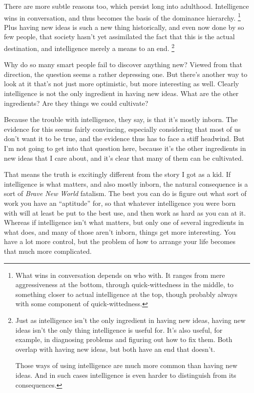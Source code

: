 There are more subtle reasons too, which persist long into adulthood.
Intelligence wins in conversation, and thus becomes the basis of the
dominance hierarchy. \footnote{What wins in conversation depends on who with. It ranges from
mere aggressiveness at the bottom, through quick-wittedness in the
middle, to something closer to actual intelligence at the top, though
probably always with some component of quick-wittedness.} Plus having new ideas is
such a new thing historically, and even now done by so few people, that
society hasn't yet assimilated the fact that this is the actual
destination, and intelligence merely a means to an end.
\footnote{Just as intelligence isn't the only ingredient in having new
ideas, having new ideas isn't the only thing intelligence is useful for.
It's also useful, for example, in diagnosing problems and figuring out
how to fix them. Both overlap with having new ideas, but both have an
end that doesn't.

Those ways of using intelligence are much more common than having new
ideas. And in such cases intelligence is even harder to distinguish from
its consequences.}

Why do so many smart people fail to discover anything new? Viewed from
that direction, the question seems a rather depressing one. But there's
another way to look at it that's not just more optimistic, but more
interesting as well. Clearly intelligence is not the only ingredient in
having new ideas. What are the other ingredients? Are they things we
could cultivate?

Because the trouble with intelligence, they say, is that it's mostly
inborn. The evidence for this seems fairly convincing, especially
considering that most of us don't want it to be true, and the evidence
thus has to face a stiff headwind. But I'm not going to get into that
question here, because it's the other ingredients in new ideas that I
care about, and it's clear that many of them can be cultivated.

That means the truth is excitingly different from the story I got as a
kid. If intelligence is what matters, and also mostly inborn, the
natural consequence is a sort of \emph{Brave New World} fatalism. The
best you can do is figure out what sort of work you have an ``aptitude''
for, so that whatever intelligence you were born with will at least be
put to the best use, and then work as hard as you can at it. Whereas if
intelligence isn't what matters, but only one of several ingredients in
what does, and many of those aren't inborn, things get more interesting.
You have a lot more control, but the problem of how to arrange your life
becomes that much more complicated.

